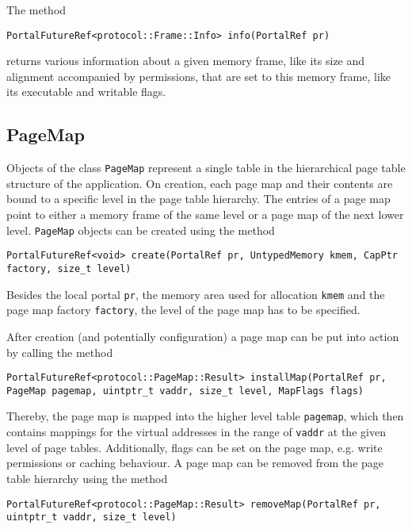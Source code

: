 The method
\lstset{language=c++,numbers=none}
\begin{lstlisting}
PortalFutureRef<protocol::Frame::Info> info(PortalRef pr)
\end{lstlisting}
\noindent returns various information about a given memory frame, like its size and
alignment accompanied by permissions, that are set to this memory frame, like
its executable and writable flags.

\subsection{PageMap}
Objects of the class \texttt{PageMap} represent a single table in the
hierarchical page table structure of the application. On creation, each page map
and their contents are bound to a specific level in the page table hierarchy.
The entries of a page map point to either a memory frame of the same level or a
page map of the next lower level.
\texttt{PageMap} objects can be created using the method
\lstset{language=c++,numbers=none}
\begin{lstlisting}
PortalFutureRef<void> create(PortalRef pr, UntypedMemory kmem, CapPtr factory, size_t level)
\end{lstlisting}
\noindent Besides the local portal \texttt{pr}, the memory area
used for allocation \texttt{kmem} and the page map factory \texttt{factory}, the
level of the page map has to be specified.

After creation (and potentially configuration) a page map can be put into action
by calling the method
\lstset{language=c++,numbers=none}
\begin{lstlisting}
PortalFutureRef<protocol::PageMap::Result> installMap(PortalRef pr, PageMap pagemap, uintptr_t vaddr, size_t level, MapFlags flags)
\end{lstlisting}
\noindent Thereby, the page map is mapped into the higher level table
\texttt{pagemap}, which then contains mappings for the virtual addresses in the
range of \texttt{vaddr} at the given level of page tables. Additionally, flags
can be set on the page map, e.g. write permissions or caching behaviour. A page
map can be removed from the page table hierarchy using the method
\lstset{language=c++,numbers=none}
\begin{lstlisting}
PortalFutureRef<protocol::PageMap::Result> removeMap(PortalRef pr, uintptr_t vaddr, size_t level)
\end{lstlisting}


